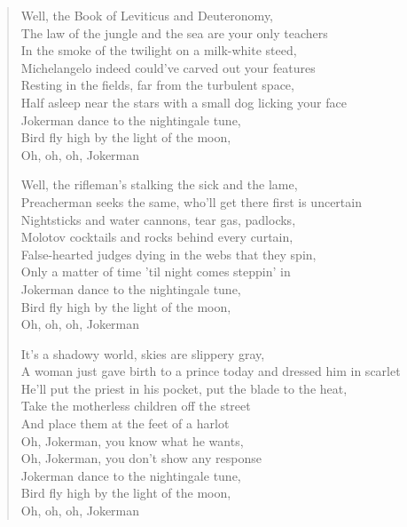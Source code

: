 \begin{verse}
Well, the Book of Leviticus and Deuteronomy, \\
The law of the jungle and the sea are your only teachers \\
In the smoke of the twilight on a milk-white steed, \\
Michelangelo indeed could've carved out your features \\
Resting in the fields, far from the turbulent space, \\
Half asleep near the stars with a small dog licking your face \\
Jokerman dance to the nightingale tune, \\
Bird fly high by the light of the moon, \\
Oh, oh, oh, Jokerman

Well, the rifleman's stalking the sick and the lame, \\
Preacherman seeks the same, who'll get there first is uncertain \\
Nightsticks and water cannons, tear gas, padlocks, \\
Molotov cocktails and rocks behind every curtain, \\
False-hearted judges dying in the webs that they spin, \\
Only a matter of time 'til night comes steppin' in \\
Jokerman dance to the nightingale tune, \\
Bird fly high by the light of the moon, \\
Oh, oh, oh, Jokerman

It's a shadowy world, skies are slippery gray, \\
A woman just gave birth to a prince today and dressed him in scarlet \\
He'll put the priest in his pocket, put the blade to the heat, \\
Take the motherless children off the street \\
And place them at the feet of a harlot \\
Oh, Jokerman, you know what he wants, \\
Oh, Jokerman, you don't show any response \\
Jokerman dance to the nightingale tune, \\
Bird fly high by the light of the moon, \\
Oh, oh, oh, Jokerman
\end{verse}
